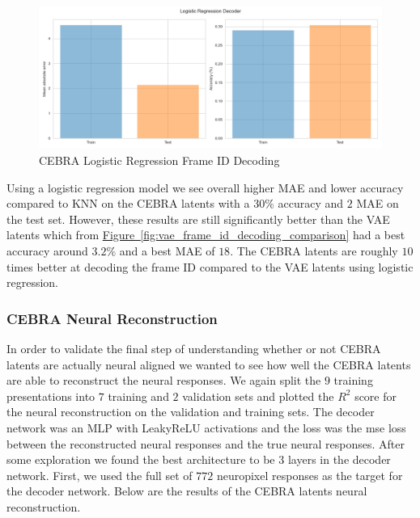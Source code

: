 \documentclass[12pt, letterpaper]{article}
\begin{document}
\begin{figure}[H]
    \centering
    \includegraphics[width=.8\textwidth]{cebra_latents_lr_decoder.png}
    \caption{CEBRA Logistic Regression Frame ID Decoding}
    \label{fig:cebra_logistic_frame_id_accuracy_mae}
\end{figure}

Using a logistic regression model we see overall higher MAE and lower accuracy compared to KNN on the CEBRA \cite{schneider2023} latents with a $30\%$ accuracy and $2$ MAE on the test set. However, these results are still significantly better than the VAE latents which from \hyperref[fig:vae_frame_id_decoding_comparison]{Figure~\ref{fig:vae_frame_id_decoding_comparison}} had a best accuracy around $3.2\%$ and a best MAE of $18$. The CEBRA \cite{schneider2023} latents are roughly $10$ times better at decoding the frame ID compared to the VAE latents using logistic regression.

\subsubsection{CEBRA Neural Reconstruction}
\label{subsubsec:cebra_neural_reconstruction}
In order to validate the final step of understanding whether or not CEBRA \cite{schneider2023} latents are actually neural aligned we wanted to see how well the CEBRA \cite{schneider2023} latents are able to reconstruct the neural responses. We again split the $9$ training presentations into $7$ training and $2$ validation sets and plotted the $R^2$ score for the neural reconstruction on the validation and training sets. The decoder network was an MLP with LeakyReLU activations and the loss was the mse loss between the reconstructed neural responses and the true neural responses. After some exploration we found the best architecture to be $3$ layers in the decoder network. First, we used the full set of $772$ neuropixel responses as the target for the decoder network. Below are the results of the CEBRA \cite{schneider2023} latents neural reconstruction.
\end{document}

